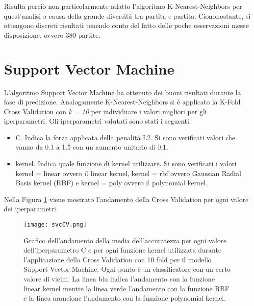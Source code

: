 Risulta perciò non particolarmente adatto l'algoritmo K-Nearest-Neighbors per quest'analisi a causa della grande diversità tra partita e partita. Ciononostante, si ottengono discreti risultati tenendo conto del fatto delle poche osservazioni messe disposizione, ovvero 380 partite.

\section{Support Vector Machine}
L'algoritmo Support Vector Machine ha ottenuto dei buoni risultati durante la fase di predizione. Analogamente K-Nearest-Neighbors si è applicato la K-Fold Cross Validation con \emph{k = 10} per individuare i valori migliori per gli iperparametri.
Gli iperparametri valutati sono stati i seguenti:
\begin{itemize}
	\item \textsf{C}. Indica la forza applicata della penalità L2. Si sono verificati valori che vanno da 0.1 a 1.5 con un aumento unitario di 0.1.
	\item \textsf{kernel}. Indica quale funzione di kernel utilizzare. Si sono verificati i valori kernel = linear ovvero il linear kernel, kernel = rbf ovvero Gaussian Radial Basis kernel (RBF) e kernel = poly ovvero il polynomial kernel.
\end{itemize}

Nella Figura \ref{fig:svcCV} viene mostrato l'andamento della Cross Validation per ogni valore dei iperparametri.
\begin{figure}[h]
	\begin{center}
		\texttt{[image: svcCV.png]}
		\caption{Grafico dell'andamento della media dell'accuratezza per ogni valore dell'iperparametro C e per ogni funzione kernel utilizzata durante l'applicazione della Cross Validation con 10 fold per il modello Support Vector Machine. Ogni punto è un classificatore con un certo valore di vicini. La linea blu indica l'andamento con la funzione linear kernel mentre la linea verde l'andamento con la funzione RBF e	la linea arancione l'andamento con la funzione polynomial kernel.
		} 
		\label{fig:svcCV}
	\end{center}
\end{figure}

